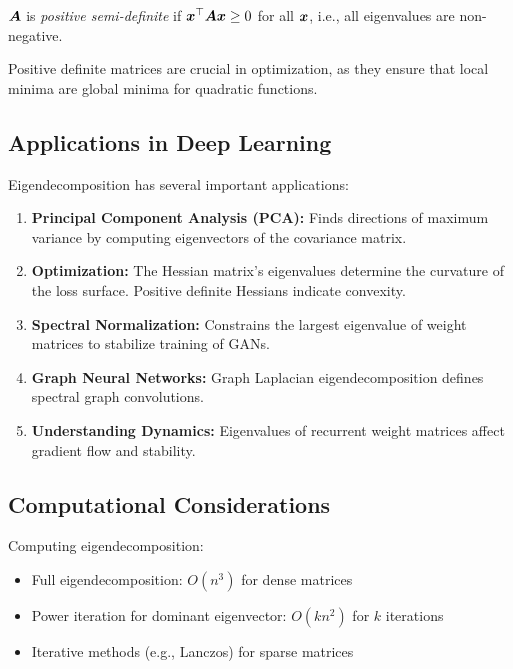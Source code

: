 \begin{definition}
$\boldsymbol{A}$ is \emph{positive semi-definite} if $\boldsymbol{x}^\top\boldsymbol{A}\boldsymbol{x} \geq 0$ for all $\boldsymbol{x}$, i.e., all eigenvalues are non-negative.
\end{definition}

Positive definite matrices are crucial in optimization, as they ensure that local minima are global minima for quadratic functions.

\subsection{Applications in Deep Learning}

Eigendecomposition has several important applications:

\begin{enumerate}
    \item \textbf{Principal Component Analysis (PCA):} Finds directions of maximum variance by computing eigenvectors of the covariance matrix.
    
    \item \textbf{Optimization:} The Hessian matrix's eigenvalues determine the curvature of the loss surface. Positive definite Hessians indicate convexity.
    
    \item \textbf{Spectral Normalization:} Constrains the largest eigenvalue of weight matrices to stabilize training of GANs.
    
    \item \textbf{Graph Neural Networks:} Graph Laplacian eigendecomposition defines spectral graph convolutions.
    
    \item \textbf{Understanding Dynamics:} Eigenvalues of recurrent weight matrices affect gradient flow and stability.
\end{enumerate}

\subsection{Computational Considerations}

Computing eigendecomposition:
\begin{itemize}
    \item Full eigendecomposition: $O(n^3)$ for dense matrices
    \item Power iteration for dominant eigenvector: $O(kn^2)$ for $k$ iterations
    \item Iterative methods (e.g., Lanczos) for sparse matrices
\end{itemize}

